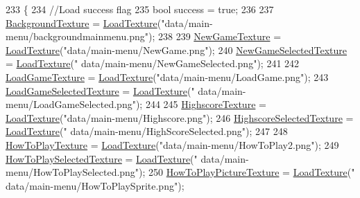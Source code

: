 \begin{DoxyCode}
233 \{
234     \textcolor{comment}{//Load success flag}
235     \textcolor{keywordtype}{bool} success = \textcolor{keyword}{true};
236 
237     \hyperlink{classStateMainMenu_a2f42ec4ca75ae671b65aa9176d2ff63f}{BackgroundTexture} = \hyperlink{classStateMainMenu_abf976d139c7276e7f354e9ecc7fb9e06}{LoadTexture}(\textcolor{stringliteral}{"data/main-menu/backgroundmainmenu.png"});
238 
239     \hyperlink{classStateMainMenu_a8c54545853bf8f34ca224ff4030016dd}{NewGameTexture} = \hyperlink{classStateMainMenu_abf976d139c7276e7f354e9ecc7fb9e06}{LoadTexture}(\textcolor{stringliteral}{"data/main-menu/NewGame.png"});
240     \hyperlink{classStateMainMenu_aa6bcd3d4dd129313a0b0c53868bb8334}{NewGameSelectedTexture} = \hyperlink{classStateMainMenu_abf976d139c7276e7f354e9ecc7fb9e06}{LoadTexture}(\textcolor{stringliteral}{"
      data/main-menu/NewGameSelected.png"});
241 
242     \hyperlink{classStateMainMenu_af12831c95e41fc915f025903e1299bc3}{LoadGameTexture} = \hyperlink{classStateMainMenu_abf976d139c7276e7f354e9ecc7fb9e06}{LoadTexture}(\textcolor{stringliteral}{"data/main-menu/LoadGame.png"});
243     \hyperlink{classStateMainMenu_a47c8756a24cb3fbbeb17402d573754c8}{LoadGameSelectedTexture} = \hyperlink{classStateMainMenu_abf976d139c7276e7f354e9ecc7fb9e06}{LoadTexture}(\textcolor{stringliteral}{"
      data/main-menu/LoadGameSelected.png"});
244 
245     \hyperlink{classStateMainMenu_ae1057cba0cec32e03cb8c0defc7bcc0b}{HighscoreTexture} = \hyperlink{classStateMainMenu_abf976d139c7276e7f354e9ecc7fb9e06}{LoadTexture}(\textcolor{stringliteral}{"data/main-menu/Highscore.png"});
246     \hyperlink{classStateMainMenu_a8302a7a3167e113b25aec8ea80997e87}{HighscoreSelectedTexture} = \hyperlink{classStateMainMenu_abf976d139c7276e7f354e9ecc7fb9e06}{LoadTexture}(\textcolor{stringliteral}{"
      data/main-menu/HighScoreSelected.png"});
247 
248     \hyperlink{classStateMainMenu_a6f376b471cd23501af052628209cabd4}{HowToPlayTexture} = \hyperlink{classStateMainMenu_abf976d139c7276e7f354e9ecc7fb9e06}{LoadTexture}(\textcolor{stringliteral}{"data/main-menu/HowToPlay2.png"});
249     \hyperlink{classStateMainMenu_afe9186d897d4dd4cf786e1496ef66ed1}{HowToPlaySelectedTexture} = \hyperlink{classStateMainMenu_abf976d139c7276e7f354e9ecc7fb9e06}{LoadTexture}(\textcolor{stringliteral}{"
      data/main-menu/HowToPlaySelected.png"});
250     \hyperlink{classStateMainMenu_a0e729c72932f87ffc6690f4ca3190672}{HowToPlayPictureTexture} = \hyperlink{classStateMainMenu_abf976d139c7276e7f354e9ecc7fb9e06}{LoadTexture}(\textcolor{stringliteral}{"
      data/main-menu/HowToPlaySprite.png"});

\end{DoxyCode}

